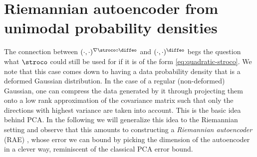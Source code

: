    \section{Riemannian autoencoder from unimodal probability densities}
    \label{sec:rae}
    
    The connection between $(\cdot,\cdot)^{\nabla \stroco \circ \diffeo}$ and $(\cdot,\cdot)^{\diffeo}$ begs the question what $\stroco$ could still be used for if it is of the form \ref{eq:quadratic-stroco}. 
    We note that this case comes down to having a data probability density that is a deformed Gaussian distribution. In the case of a regular (non-deformed) Gaussian, one can compress the data generated by it through projecting them onto a low rank approximation of the covariance matrix such that only the directions with highest variance are taken into account. This is the basic idea behind PCA. In the following we will generalize this idea to the Riemannian setting and observe that this amounts to constructing a \emph{Riemannian autoencoder} (RAE) \cite{diepeveen2024pulling}, whose error we can bound by picking the dimension of the autoencoder in a clever way, reminiscent of the classical PCA error bound.

